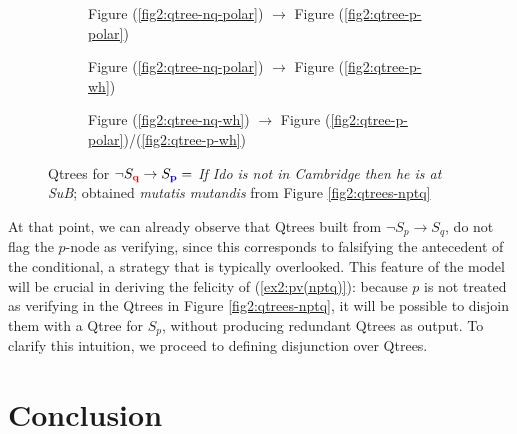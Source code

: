 \begin{figure}[H]
	\centering
	\begin{subfigure}[b]{.3\linewidth}
		\centering
		\caption{Figure (\ref{fig2:qtree-nq-polar}) $\rightarrow$ Figure (\ref{fig2:qtree-p-polar})}\label{fig2:qtree-nqtp-polar-polar}
	\end{subfigure}\hfill
	\begin{subfigure}[b]{.3\linewidth}
		\centering
		\caption{Figure (\ref{fig2:qtree-nq-polar}) $\rightarrow$ Figure (\ref{fig2:qtree-p-wh})}\label{fig2:qtree-nqtp-polar-wh}
	\end{subfigure}\hfill
	\begin{subfigure}[b]{.3\linewidth}
		\centering
		\scalebox{1}{
			\begin{forest}
				[CS [{$\q$}][\fbox{$\p$}][\dbox{$\r$}][\dbox{...}]]
			\end{forest}
		}
		\caption{Figure (\ref{fig2:qtree-nq-wh}) $\rightarrow$ Figure (\ref{fig2:qtree-p-polar})/(\ref{fig2:qtree-p-wh})}\label{fig2:qtree-nqtp-wh}
	\end{subfigure}
	\caption[]{Qtrees for $\neg S\protect_{\textbf{\textcolor{red}{q}}} \rightarrow S\protect_{\textbf{\textcolor{blue}{p}}} =$ \textit{If Ido is not in Cambridge then he is at SuB}; obtained \textit{mutatis mutandis} from Figure \ref{fig2:qtrees-nptq}}
	\label{fig2:qtrees-nqtp}
\end{figure}

At that point, we can already observe that Qtrees built from $\neg S_{p} \rightarrow S_q$, do not flag the $p$-node as verifying, since this corresponds to falsifying the antecedent of the conditional, a strategy that is typically overlooked. This feature of the model will be crucial in deriving the felicity of (\ref{ex2:pv(nptq)}): because $p$ is not treated as verifying in the Qtrees in Figure \ref{fig2:qtrees-nptq}, it will be possible to disjoin them with a Qtree for $S_p$, without producing redundant Qtrees as output. To clarify this intuition, we proceed to defining disjunction over Qtrees.






\section{Conclusion}


